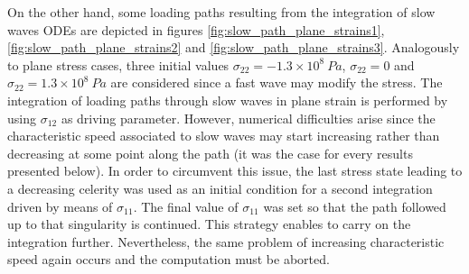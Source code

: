On the other hand, some loading paths resulting from the integration of slow waves ODEs are depicted in figures \ref{fig:slow_path_plane_strains1}, \ref{fig:slow_path_plane_strains2} and \ref{fig:slow_path_plane_strains3}.
Analogously to plane stress cases, three initial values $\sigma_{22}=-1.3 \times 10^{8} \: Pa$, $\sigma_{22}=0$ and $\sigma_{22}=1.3 \times 10^8 \: Pa$ are considered since a fast wave may modify the stress.
The integration of loading paths through slow waves in plane strain is performed by using $\sigma_{12}$ as driving parameter.
However, numerical difficulties arise since the characteristic speed associated to slow waves may start increasing rather than decreasing at some point along the path (it was the case for every results presented below).
In order to circumvent this issue, the last stress state leading to a decreasing celerity was used as an initial condition for a second integration driven by means of $\sigma_{11}$.
The final value of $\sigma_{11}$ was set so that the path followed up to that singularity is continued.
This strategy enables to carry on the integration further.
Nevertheless, the same problem of increasing characteristic speed again occurs and the computation must be aborted.

